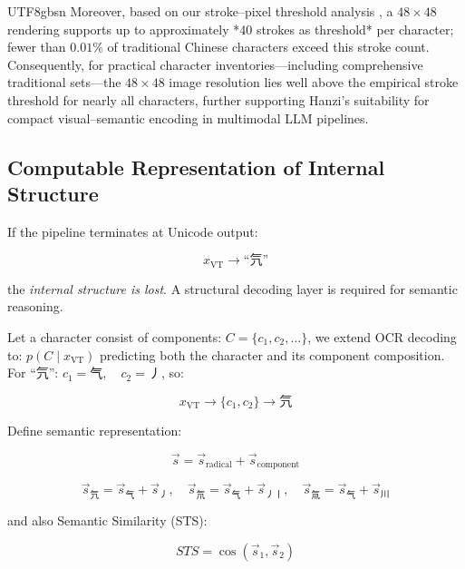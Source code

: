 \documentclass[conference]{IEEEtran}
\begin{document}
\begin{CJK*}{UTF8}{gbsn}
Moreover, based on our stroke–pixel threshold analysis \cite{weigang2025threshold}, a \(48\times48\) rendering supports up to approximately *40 strokes as threshold* per character; fewer than \(0.01\%\) of traditional Chinese characters exceed this stroke count. Consequently, for practical character inventories—including comprehensive traditional sets—the \(48\times48\) image resolution lies well above the empirical stroke threshold for nearly all characters, further supporting Hanzi’s suitability for compact visual–semantic encoding in multimodal LLM pipelines.

\subsection{Computable Representation of Internal Structure}
If the pipeline terminates at Unicode output:

\begin{equation}
x_{\text{VT}} \rightarrow \text{``氕''} 
\end{equation}

the \emph{internal structure is lost}.  
A structural decoding layer is required for semantic reasoning.

Let a character consist of components:
$C = \{c_1, c_2, \ldots\}$, we extend OCR decoding to: $
p(C \mid x_{\text{VT}})$ predicting both the character and its component composition. For ``氕'':
$c_1 = \text{气}, \quad c_2 = \text{丿}$, so:

\begin{equation}
x_{\text{VT}} \rightarrow \{c_1, c_2\} \rightarrow \text{氕}
\end{equation}

Define semantic representation:

\begin{equation}
\vec{s} = \vec{s}_{\text{radical}} + \vec{s}_{\text{component}}
\end{equation}

\[ \vec{s}_{\text{氕}} = \vec{s}_{\text{气}} + \vec{s}_{\text{丿}}, \quad \vec{s}_{\text{氘}} = \vec{s}_{\text{气}} + \vec{s}_{\text{丿丨}}, \quad \vec{s}_{\text{氚}} = \vec{s}_{\text{气}} + \vec{s}_{\text{川}} \]

and also Semantic Similarity (STS):

\begin{equation}
STS = \cos(\vec{s}_1, \vec{s}_2)
\end{equation}


\end{CJK*}
\end{document}
